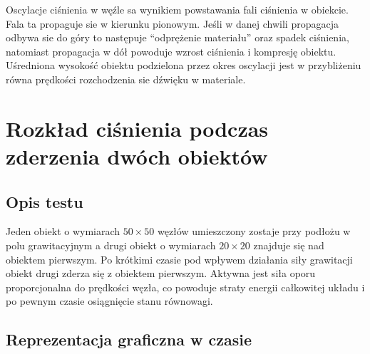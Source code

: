 \documentclass[12pt, letterpaper]{report}
\begin{document}
    Oscylacje ciśnienia w węźle sa wynikiem powstawania fali ciśnienia w obiekcie.
    Fala ta propaguje sie w kierunku pionowym. Jeśli w danej chwili propagacja odbywa sie 
    do góry to następuje ``odprężenie materiału'' oraz spadek ciśnienia, natomiast propagacja w dół 
    powoduje wzrost ciśnienia i kompresję obiektu. Uśredniona wysokość obiektu podzielona przez okres
    oscylacji jest w przybliżeniu równa prędkości rozchodzenia sie dźwięku w materiale.

    \clearpage
    \section{Rozkład ciśnienia podczas zderzenia dwóch obiektów}
    \subsection{Opis testu}
    Jeden obiekt o wymiarach $50 \times 50$ węzłów umieszczony zostaje przy podłożu w polu grawitacyjnym a
    drugi obiekt o wymiarach $20 \times 20$ znajduje się nad obiektem pierwszym. Po krótkimi czasie pod wpływem
    działania siły grawitacji obiekt drugi zderza się z obiektem pierwszym. Aktywna jest siła oporu 
    proporcjonalna do prędkości węzła, co powoduje straty energii całkowitej układu i po pewnym czasie osiągnięcie
    stanu równowagi.

    \subsection{Reprezentacja graficzna w czasie}
\end{document}
